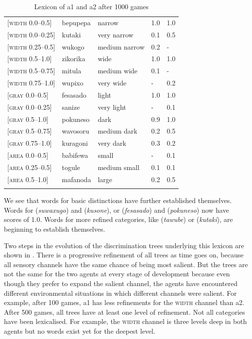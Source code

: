 \begin{table}
\begin{center}
\begin{tabular}{ l  l  l  l  l }
\lsptoprule
{}[\textsc{width} 0.0–0.5]&bepupepa&narrow & 1.0&1.0\\ 
{}[\textsc{width} 0.0–0.25]&kutaki&very narrow & 0.1&0.5\\ 
{}[\textsc{width} 0.25–0.5]&wukogo&medium narrow & 0.2&-\\ 
{}[\textsc{width} 0.5–1.0]&zikorika&wide & 1.0&1.0\\ 
{}[\textsc{width} 0.5–0.75]&mitula&medium wide &0.1&-\\ 
{}[\textsc{width} 0.75–1.0]&wupixo&very wide & -&0.2\\ 
{}[\textsc{gray} 0.0–0.5]&fesasado&light & 1.0&1.0\\ 
{}[\textsc{gray} 0.0–0.25]&sanize&very light & -&0.1\\ 
{}[\textsc{gray} 0.5–1.0]&pokuneso&dark &0.9&1.0\\ 
{}[\textsc{gray} 0.5–0.75]&wavosoru&medium dark & 0.2&0.5\\ 
{}[\textsc{gray} 0.75–1.0]&kuragoni&very dark &0.3&0.2\\ 
{}[\textsc{area} 0.0–0.5]&babifewa&small & -&0.1\\ 
{}[\textsc{area} 0.25–0.5]&togule&medium small & 0.1&0.1\\ 
{}[\textsc{area} 0.5–1.0]&mafanoda&large & 0.2&0.5\\ 
\lspbottomrule
\end{tabular}
\caption{\label{tab:lex500b}Lexicon of {\bfshape  a1} and {\bfshape  a2} after 1000 games}
\end{center}
\end{table}

We see that words for  basic distinctions have further established
themselves. Words for  (\emph{suwaxugo}) and  (\emph{kusone}), or  (\emph{fesasado}) and  (\emph{pokuneso}) now have scores of 1.0. Words for more refined categories, like  (\emph{tawube}) or  (\emph{kutaki}), are beginning to establish themselves.  

Two steps in the evolution of the discrimination trees
underlying this lexicon are shown in .
There is a progressive refinement 
of all trees as time goes on, 
because all sensory channels have the same chance
of being most salient. But the trees are not 
the same for the two agents at every stage
of development because even though they prefer to expand
the salient channel, the agents have encountered 
different environmental situations in which different
channels were salient. For example, after 100 
games, {\bfshape  a1} has less refinements for the 
\textsc{width} channel than {\bfshape  a2}. 
After 500 games, all trees 
have at least one level of refinement. Not all 
categories have been lexicalised. For example, the 
\textsc{width} channel is three levels deep in both 
agents but no words exist yet for the deepest 
level. 


